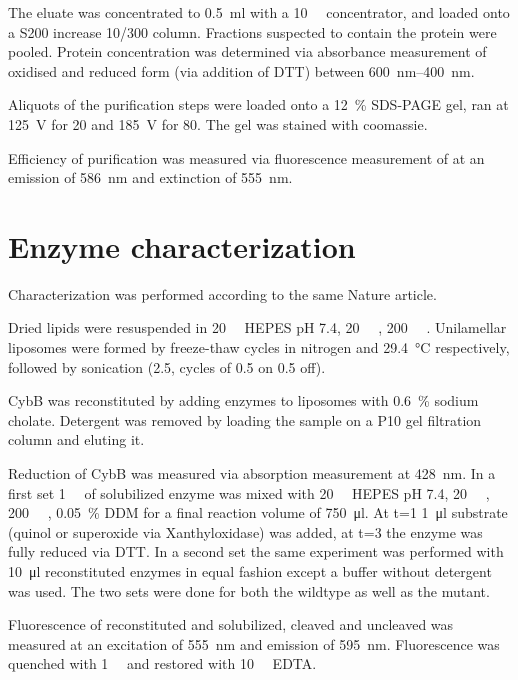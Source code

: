 The eluate was concentrated to \SI{0.5}{\ml} with a \SI{10}{\kilo\Da}
concentrator, and loaded onto a S200 increase 10/300 column. Fractions
suspected to contain the protein were pooled. Protein concentration was
determined via absorbance measurement of oxidised and reduced form (via addition
of DTT) between \SIrange{600}{400}{\nm}.

Aliquots of the purification steps were loaded onto a \SI{12}{\percent}
SDS-PAGE gel, ran at \SI{125}{\V} for \SI{20}{\min} and \SI{185}{\V} for
\SI{80}{\min}. The gel was stained with coomassie.

Efficiency of purification was measured via fluorescence measurement of
\hsdsred{} at an emission of \SI{586}{\nm} and extinction of \SI{555}{\nm}.

\section{Enzyme characterization}

Characterization was performed according to the same Nature
article\cite{superoxide_salvaging}.

Dried lipids were resuspended in \SI{20}{\milli\Molar} HEPES pH 7.4,
\SI{20}{\milli\Molar} , \SI{200}{\milli\Molar} . Unilamellar
liposomes were formed by freeze-thaw cycles in nitrogen and \SI{29.4}{\celsius}
respectively, followed by sonication (\SI{2.5}{\min}, cycles of \SI{0.5}{\min}
on \SI{0.5}{\min} off).

CybB was reconstituted by adding enzymes to liposomes with \SI{0.6}{\percent}
sodium cholate. Detergent was removed by loading the sample on a P10 gel
filtration column and eluting it.

Reduction of CybB was measured via absorption measurement at \SI{428}{\nm}. In
a first set \SI{1}{\micro\Molar} of solubilized enzyme was mixed with
\SI{20}{\milli\Molar} HEPES pH 7.4, \SI{20}{\milli\Molar} ,
\SI{200}{\milli\Molar} , \SI{0.05}{\percent} DDM for a final reaction
volume of \SI{750}{\ul}. At t=\SI{1}{\min} \SI{1}{\ul} substrate (quinol or
superoxide via Xanthyloxidase) was added, at t=\SI{3}{\min} the enzyme was
fully reduced via DTT. In a second set the same experiment was performed with
\SI{10}{\ul} reconstituted enzymes in equal fashion except a buffer without
detergent was used. The two sets were done for both the wildtype as well as the
mutant.

Fluorescence of reconstituted and solubilized, cleaved and uncleaved \hsdsred{}
was measured at an excitation of \SI{555}{\nm} and emission of \SI{595}{\nm}.
Fluorescence was quenched with \SI{1}{\milli\Molar}  and restored with
\SI{10}{\milli\Molar} EDTA.

